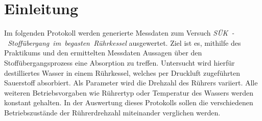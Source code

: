 %
\pagebreak
\section{Einleitung}
\label{sec:einleitung}
Im folgenden Protokoll werden generierte Messdaten zum Versuch \linebreak \mbox{\textit{SÜK - Stoffübergang im begasten Rührkessel}} ausgewertet. Ziel ist es, mithilfe des Praktikums und den ermittelten Messdaten Aussagen über den Stoffübergangsprozess eine Absorption zu treffen. Untersucht wird hierfür destilliertes Wasser in einem Rührkessel, welches per Druckluft zugeführten Sauerstoff  absorbiert. Als Parameter wird die Drehzahl des Rührers variiert. Alle weiteren Betriebsvorgaben wie Rührertyp oder Temperatur des Wassers werden konstant gehalten. In der Auswertung dieses Protokolls sollen die verschiedenen Betriebszustände der Rührerdrehzahl miteinander verglichen werden. 






